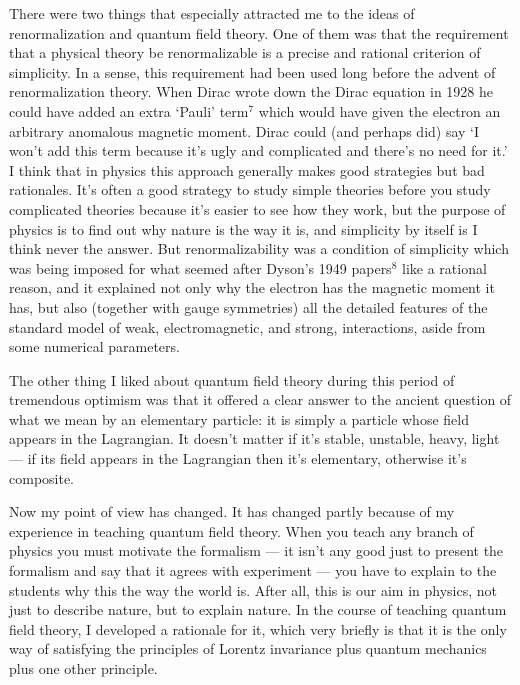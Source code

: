 There were two things that especially attracted me to the
ideas of renormalization and quantum field theory.  One of
them was that the requirement that a physical theory be
renormalizable is a precise and rational criterion of
simplicity.  In a sense, this requirement had been used long
before the advent of renormalization theory.  When Dirac
wrote down the Dirac equation in 1928 he could have added an
extra `Pauli' term$^7$ which would have given the electron
an
arbitrary anomalous magnetic moment.  Dirac could (and
perhaps did) say `I won't add this term because it's ugly
and complicated and there's no need for it.'   I think that
in physics this approach generally makes good strategies but
bad rationales.  It's often a good strategy to study simple
theories before you study complicated theories because it's
easier to see how they work, but the purpose of physics is
to find out why nature is the way it is, and simplicity by
itself is I think never the answer.  But renormalizability
was a condition of simplicity which was being imposed for
what seemed after Dyson's 1949 papers$^8$ like a rational
reason, and it explained not only why the electron has the
magnetic moment it has, but also (together with gauge
symmetries) all the detailed features of the standard model
of weak, electromagnetic, and strong, interactions, aside
from some numerical parameters.

The other thing I liked about quantum field theory during
this period of tremendous optimism was that it offered a
clear answer to the ancient question of what we mean by an
elementary particle: it is simply a particle whose field
appears in the Lagrangian. It doesn't matter if it's stable,
unstable, heavy, light --- if its field appears in the
Lagrangian then it's elementary, otherwise it's
composite.

Now my point of view has changed.  It has changed partly
because of my  experience in teaching quantum field theory.
When you teach any branch of physics you must motivate the
formalism --- it isn't any good just to present the
formalism and say that it agrees with experiment --- you
have to explain to the students why this the way the world
is.  After all, this is our aim in physics, not just to
describe nature, but to explain nature.  In the course of
teaching quantum field theory, I developed a rationale for
it, which very briefly is that it is the only way of
satisfying the principles of Lorentz invariance plus quantum
mechanics plus one other principle.

